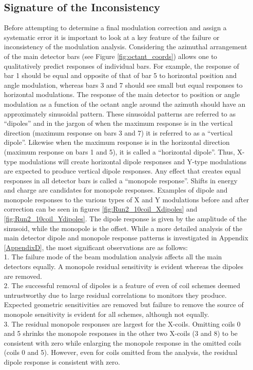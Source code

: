 \subsection{Signature of the Inconsistency}
Before attempting to determine a final modulation correction and assign a systematic error it is important to look at a key feature of the failure or inconsistency of the modulation analysis. Considering the azimuthal arrangement of the main detector bars (see Figure \ref{fig:octant_coords}) allows one to qualitatively predict responses of individual bars. For example, the response of bar 1 should be equal and opposite of that of bar 5 to horizontal position and angle modulation, whereas bars 3 and 7 should see small but equal responses to horizontal modulations. The response of the main detector to position or angle modulation as a function of the octant angle around the azimuth should have an approximately sinusoidal pattern. These sinusoidal patterns are referred to as ``dipoles'' and in the jargon of \Qs when the maximum response is in the vertical direction (maximum response on bars 3 and 7) it is referred to  as a ``vertical dipole''. Likewise when the maximum response is in the horizontal direction (maximum response on bars 1 and 5), it is called a ``horizontal dipole''. Thus, X-type modulations will create horizontal dipole responses and Y-type modulations are expected to produce vertical dipole responses. Any effect that creates equal responses in all detector bars is called a ``monopole response''. Shifts in energy and charge are candidates for monopole responses. Examples of dipole and monopole responses to the various types of X and Y modulations before and after correction  can be seen in figures \ref{fig:Run2_10coil_Xdipoles} and \ref{fig:Run2_10coil_Ydipoles}. The dipole response is given by the amplitude of the sinusoid, while the monopole is the offset. While a more detailed analysis of the main detector dipole and monopole response patterns is investigated in Appendix \ref{AppendixD}, the most significant observations are as follows:\\
1. The failure mode of the beam modulation analysis affects all the main detectors equally. A monopole residual sensitivity is evident whereas the dipoles are removed.\\
2. The successful removal of dipoles is a feature of even of coil schemes deemed untrustworthy due to large residual correlations to monitors they produce. Expected geometric sensitivities are removed but failure to remove the source of monopole sensitivity is evident for all schemes, although not equally.\\
3. The residual monopole responses are largest for the X-coils. Omitting coils 0 and 5 shrinks the monopole responses in the other two X-coils (3 and 8) to be consistent with zero while enlarging the monopole response in the omitted coils (coils 0 and 5). However, even for coils omitted from the analysis, the residual dipole response is consistent with zero.\\ 

